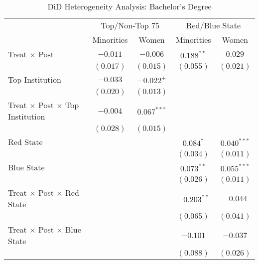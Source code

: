 
\usepackage{booktabs}

\begin{table}
\caption{DiD Heterogeneity Analysis: Bachelor's Degree}
\begin{center}
\begin{tabular}{l c c c c}
\toprule
 & \multicolumn{2}{c}{Top/Non-Top 75} & \multicolumn{2}{c}{Red/Blue State} \\
\cmidrule(lr){2-3} \cmidrule(lr){4-5}
 & Minorities & Women & Minorities & Women \\
\midrule
Treat $\times$ Post                          & $-0.011$  & $-0.006$      & $0.188^{**}$  & $0.029$       \\
                                             & $(0.017)$ & $(0.015)$     & $(0.055)$     & $(0.021)$     \\
Top Institution                              & $-0.033$  & $-0.022^{+}$  &               &               \\
                                             & $(0.020)$ & $(0.013)$     &               &               \\
Treat $\times$ Post $\times$ Top Institution & $-0.004$  & $0.067^{***}$ &               &               \\
                                             & $(0.028)$ & $(0.015)$     &               &               \\
Red State                                    &           &               & $0.084^{*}$   & $0.040^{***}$ \\
                                             &           &               & $(0.034)$     & $(0.011)$     \\
Blue State                                   &           &               & $0.073^{**}$  & $0.055^{***}$ \\
                                             &           &               & $(0.026)$     & $(0.011)$     \\
Treat $\times$ Post $\times$ Red State       &           &               & $-0.203^{**}$ & $-0.044$      \\
                                             &           &               & $(0.065)$     & $(0.041)$     \\
Treat $\times$ Post $\times$ Blue State      &           &               & $-0.101$      & $-0.037$      \\
                                             &           &               & $(0.088)$     & $(0.026)$     \\

\end{tabular}
\end{center}
\end{table}
